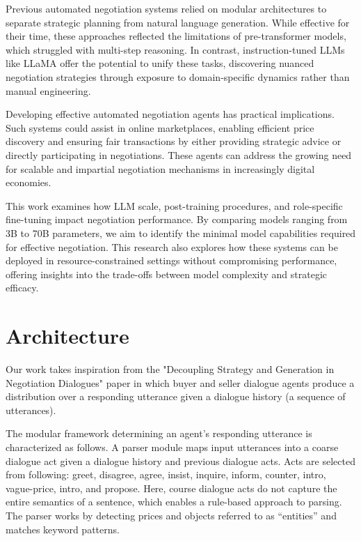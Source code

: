 \documentclass[11pt]{article}
\begin{document}
Previous automated negotiation systems \citep{he-etal-2018} relied on modular architectures to separate strategic planning from natural language generation. While effective for their time, these approaches reflected the limitations of pre-transformer models, which struggled with multi-step reasoning. In contrast, instruction-tuned LLMs like LLaMA \citep{touvron2023llamaopenefficientfoundation} offer the potential to unify these tasks, discovering nuanced negotiation strategies through exposure to domain-specific dynamics rather than manual engineering.

Developing effective automated negotiation agents has practical implications. Such systems could assist in online marketplaces, enabling efficient price discovery and ensuring fair transactions by either providing strategic advice or directly participating in negotiations. These agents can address the growing need for scalable and impartial negotiation mechanisms in increasingly digital economies.

This work examines how LLM scale, post-training procedures, and role-specific fine-tuning impact negotiation performance. By comparing models ranging from 3B to 70B parameters, we aim to identify the minimal model capabilities required for effective negotiation. This research also explores how these systems can be deployed in resource-constrained settings without compromising performance, offering insights into the trade-offs between model complexity and strategic efficacy.


\section{Architecture}
Our work takes inspiration from the "Decoupling Strategy and Generation in Negotiation Dialogues" \citep{he-etal-2018} paper in which buyer and seller dialogue agents produce a distribution over a responding utterance given a dialogue history (a sequence of utterances). 

The modular framework determining an agent’s responding utterance is characterized as follows. A parser module maps input utterances into a coarse dialogue act given a dialogue history and previous dialogue acts. Acts are selected from following: greet, disagree, agree, insist, inquire, inform, counter, intro, vague-price, intro, and propose. Here, course dialogue acts do not capture the entire semantics of a sentence, which enables a rule-based approach to parsing. The parser works by detecting prices and objects referred to as “entities” and matches keyword patterns. 
\end{document}
